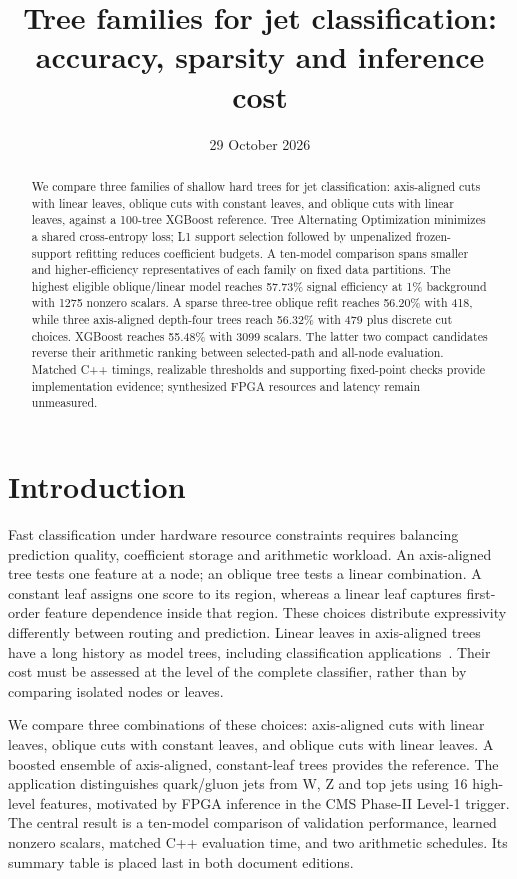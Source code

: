 \documentclass[11pt,a4paper]{article}
\title{Tree families for jet classification: accuracy, sparsity and inference cost}
\author{}
\date{29 October 2026}
\begin{document}
\maketitle
\begin{abstract}
We compare three families of shallow hard trees for jet classification:
axis-aligned cuts with linear leaves, oblique cuts with constant leaves, and
oblique cuts with linear leaves, against a 100-tree XGBoost reference.
Tree Alternating Optimization minimizes a shared cross-entropy loss; L1
support selection followed by unpenalized frozen-support refitting reduces
coefficient budgets. A ten-model comparison spans smaller and higher-efficiency
representatives of each family on fixed data partitions. The highest eligible
oblique/linear model reaches 57.73\% signal efficiency at 1\% background with
1275 nonzero scalars. A sparse three-tree oblique refit reaches 56.20\% with
418, while three axis-aligned depth-four trees reach 56.32\% with 479 plus
discrete cut choices. XGBoost reaches 55.48\% with 3099 scalars. The latter
two compact candidates reverse their arithmetic ranking between selected-path
and all-node evaluation. Matched C++ timings, realizable thresholds and
supporting fixed-point checks provide implementation evidence; synthesized
FPGA resources and latency remain unmeasured.
\end{abstract}

\section{Introduction}
\label{sec:intro}
Fast classification under hardware resource constraints requires balancing
prediction quality, coefficient storage and arithmetic workload. An axis-aligned
tree tests one feature at a node; an oblique tree tests a linear combination.
A constant leaf assigns one score to its region, whereas a linear leaf captures
first-order feature dependence inside that region. These choices distribute
expressivity differently between routing and prediction. Linear leaves in
axis-aligned trees have a long history as model trees, including classification
applications~\cite{modeltrees1998}. Their cost must be assessed at the level of
the complete classifier, rather than by comparing isolated nodes or leaves.

We compare three combinations of these choices: axis-aligned cuts with linear
leaves, oblique cuts with constant leaves, and oblique cuts with linear leaves.
A boosted ensemble of axis-aligned, constant-leaf trees provides the reference.
The application distinguishes quark/gluon jets from W, Z and top jets using
16 high-level features, motivated by FPGA inference in the CMS Phase-II
Level-1 trigger. The central result is a ten-model comparison of validation
performance, learned nonzero scalars, matched C++ evaluation time, and two
arithmetic schedules. Its summary table is placed last in both document editions.
\end{document}
